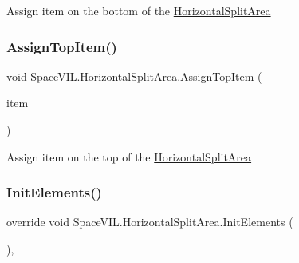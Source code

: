 Assign item on the bottom of the \mbox{\hyperlink{class_space_v_i_l_1_1_horizontal_split_area}{Horizontal\+Split\+Area}} 

\mbox{\label{class_space_v_i_l_1_1_horizontal_split_area_aecce1e6d987c61a20f1ae41513becefc}} 
\subsubsection{\texorpdfstring{Assign\+Top\+Item()}{AssignTopItem()}}
{\footnotesize\ttfamily void Space\+V\+I\+L.\+Horizontal\+Split\+Area.\+Assign\+Top\+Item (\begin{DoxyParamCaption}\item[{\mbox{\hyperlink{interface_space_v_i_l_1_1_core_1_1_i_base_item}{I\+Base\+Item}}}]{item }\end{DoxyParamCaption})\hspace{0.3cm}{\ttfamily [inline]}}



Assign item on the top of the \mbox{\hyperlink{class_space_v_i_l_1_1_horizontal_split_area}{Horizontal\+Split\+Area}} 

\mbox{\label{class_space_v_i_l_1_1_horizontal_split_area_ac977d45d7056f67bbd353877ff204df9}} 
\subsubsection{\texorpdfstring{Init\+Elements()}{InitElements()}}
{\footnotesize\ttfamily override void Space\+V\+I\+L.\+Horizontal\+Split\+Area.\+Init\+Elements (\begin{DoxyParamCaption}{ }\end{DoxyParamCaption})\hspace{0.3cm}{\ttfamily [inline]}, {\ttfamily [virtual]}}




